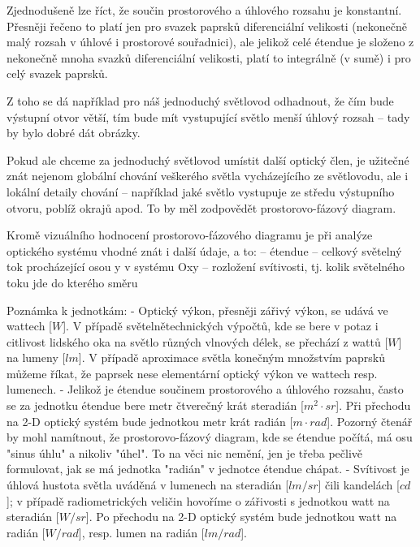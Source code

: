 Zjednodušeně lze říct, že součin prostorového a úhlového rozsahu je
konstantní. Přesněji řečeno to platí jen pro svazek paprsků
diferenciální velikosti (nekonečně malý rozsah v úhlové i prostorové
souřadnici), ale jelikož celé étendue je složeno z nekonečně mnoha
svazků diferenciální velikosti, platí to integrálně (v sumě) i pro celý
svazek paprsků.


Z toho se dá například pro náš jednoduchý světlovod odhadnout, že čím
bude výstupní otvor větší, tím bude mít vystupující světlo menší úhlový
rozsah -- tady by bylo dobré dát obrázky.

Pokud ale chceme za jednoduchý světlovod umístit další optický člen, je
užitečné znát nejenom globální chování veškerého světla vycházejícího ze
světlovodu, ale i lokální detaily chování -- například jaké světlo
vystupuje ze středu výstupního otvoru, poblíž okrajů apod. To by měl
zodpovědět prostorovo-fázový diagram.

Kromě vizuálního hodnocení prostorovo-fázového diagramu je při analýze
optického systému vhodné znát i další údaje, a to:
-- étendue
-- celkový světelný tok procházející osou y v systému Oxy
-- rozložení svítivosti, tj. kolik světelného toku jde do kterého směru

Poznámka k jednotkám:
- Optický výkon, přesněji zářivý výkon, se udává ve wattech [$W$]. V
případě světelnětechnických výpočtů, kde se bere v potaz i citlivost
lidského oka na světlo různých vlnových délek, se přechází z wattů [$W$]
na lumeny [$lm$]. V případě aproximace světla konečným množstvím paprsků
můžeme říkat, že paprsek nese elementární optický výkon ve wattech resp.
lumenech.
- Jelikož je étendue součinem prostorového a úhlového rozsahu, často se
za jednotku étendue bere metr čtverečný krát steradián [$m^2 \cdot sr$]. Při
přechodu na 2-D optický systém bude jednotkou metr krát radián [$m \cdot rad$].
Pozorný čtenář by mohl namítnout, že prostorovo-fázový diagram,
kde se étendue počítá, má osu "sinus úhlu" a nikoliv "úhel". To na věci
nic nemění, jen je třeba pečlivě formulovat, jak se má jednotka "radián"
v jednotce étendue chápat.
- Svítivost je úhlová hustota světla uváděná v lumenech na steradián
[$lm/sr$] čili kandelách [$cd$]; v případě radiometrických veličin hovoříme
o zářivosti s jednotkou watt na steradián [$W/sr$]. Po přechodu na 2-D
optický systém bude jednotkou watt na radián [$W/rad$], resp. lumen na
radián [$lm/rad$].

